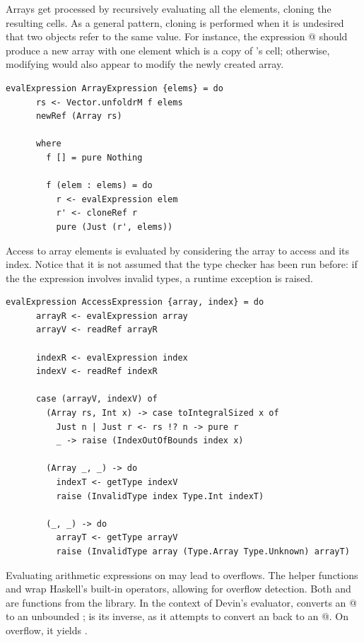 \documentclass[UdineBachThesis,american,11pt,draft]{PhdThesis}
\begin{document}
  Arrays get processed by recursively evaluating all the elements, cloning the
  resulting cells. As a general pattern, cloning is performed when it is
  undesired that two objects refer to the same value. For instance, the
  expression \lstinline@[x]@ should produce a new array with one element which
  is a copy of \lstinline@x@'s cell; otherwise, modifying \lstinline@x@ would
  also appear to modify the newly created array.

  \begin{lstlisting}[gobble=4,basicstyle=\ttfamily\small]
    evalExpression ArrayExpression {elems} = do
      rs <- Vector.unfoldrM f elems
      newRef (Array rs)

      where
        f [] = pure Nothing

        f (elem : elems) = do
          r <- evalExpression elem
          r' <- cloneRef r
          pure (Just (r', elems))
  \end{lstlisting}

  Access to array elements is evaluated by considering the array to access and
  its index. Notice that it is not assumed that the type checker has been run
  before: if the the expression involves invalid types, a runtime exception is
  raised.

  \begin{lstlisting}[gobble=4,basicstyle=\ttfamily\small]
    evalExpression AccessExpression {array, index} = do
      arrayR <- evalExpression array
      arrayV <- readRef arrayR

      indexR <- evalExpression index
      indexV <- readRef indexR

      case (arrayV, indexV) of
        (Array rs, Int x) -> case toIntegralSized x of
          Just n | Just r <- rs !? n -> pure r
          _ -> raise (IndexOutOfBounds index x)

        (Array _, _) -> do
          indexT <- getType indexV
          raise (InvalidType index Type.Int indexT)

        (_, _) -> do
          arrayT <- getType arrayV
          raise (InvalidType array (Type.Array Type.Unknown) arrayT)
  \end{lstlisting}

  Evaluating arithmetic expressions on \lstinline@Int@s may lead to overflows.
  The helper functions \lstinline@safeUnary@ and \lstinline@safeBinary@ wrap
  Haskell's built-in operators, allowing for overflow detection. Both
  \lstinline@toInteger@ and \lstinline@toIntegralSized@ are functions from the
  \lstinline@base@ library. In the context of Devin's evaluator,
  \lstinline@toInteger@ converts an @ to an unbounded
  \lstinline@Integer@; \lstinline@toIntegralSized@ is its inverse, as it
  attempts to convert an \lstinline@Integer@ back to an @. On
  overflow, it yields \lstinline@Nothing@.
\end{document}
